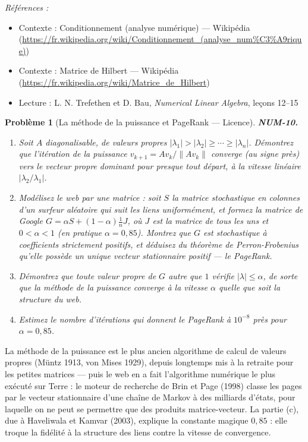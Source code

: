 \documentclass[11pt]{article}
\newtheorem{problem}{Problème}
\newenvironment{refs}{\par\small\noindent\emph{Références :}\begin{itemize}\setlength\itemsep{0pt}}{\end{itemize}\normalsize}
\begin{document}
\begin{refs}
\item Contexte : Conditionnement (analyse numérique) --- Wikipédia (\url{https://fr.wikipedia.org/wiki/Conditionnement_(analyse_num%C3%A9rique)})
\item Contexte : Matrice de Hilbert --- Wikipédia (\url{https://fr.wikipedia.org/wiki/Matrice_de_Hilbert})
\item Lecture : L. N. Trefethen et D. Bau, \textit{Numerical Linear Algebra}, leçons 12--15
\end{refs}

\bigskip

\begin{problem}[{La méthode de la puissance et PageRank --- Licence}]
\textbf{NUM-10.} \begin{enumerate}
\item[(a)] Soit $A$ diagonalisable, de
valeurs propres $|\lambda_1| > |\lambda_2| \ge \cdots \ge |\lambda_n|$. Démontrez que
l'itération de la puissance $v_{k+1} = A v_k / \|A v_k\|$ converge (au signe près)
vers le vecteur propre dominant pour presque tout départ, à la vitesse linéaire
$|\lambda_2/\lambda_1|$.
\item[(b)] Modélisez le web par une matrice : soit $S$ la
matrice stochastique en colonnes d'un surfeur aléatoire qui suit les liens
uniformément, et formez la matrice de Google $G = \alpha S + (1-\alpha)\tfrac{1}{n}J$,
où $J$ est la matrice de tous les uns et $0 < \alpha < 1$ (en pratique
$\alpha = 0{,}85$). Montrez que $G$ est stochastique à coefficients strictement
positifs, et déduisez du théorème de Perron-Frobenius qu'elle possède un unique
vecteur stationnaire positif --- le PageRank.
\item[(c)] Démontrez que toute valeur propre de $G$ autre que $1$ vérifie
$|\lambda| \le \alpha$, de sorte que la méthode de la puissance converge à la
vitesse $\alpha$ quelle que soit la structure du web.
\item[(d)] Estimez le nombre d'itérations qui donnent le PageRank
à $10^{-8}$ près pour $\alpha = 0{,}85$.
\end{enumerate}

\end{problem}

\noindent La méthode de la puissance est le plus ancien algorithme de calcul
de valeurs propres (Müntz 1913, von Mises 1929), depuis longtemps mis à la retraite
pour les petites matrices --- puis le web en a fait l'algorithme numérique le plus
exécuté sur Terre : le moteur de recherche de Brin et Page (1998) classe les pages
par le vecteur stationnaire d'une chaîne de Markov à des milliards d'états, pour
laquelle on ne peut se permettre que des produits matrice-vecteur. La partie (c), due
à Haveliwala et Kamvar (2003), explique la constante magique $0{,}85$ : elle
troque la fidélité à la structure des liens contre la vitesse de convergence.
\end{document}
